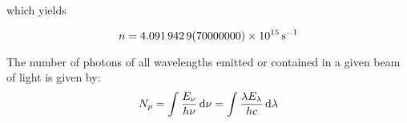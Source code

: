 which yields

\[
n=\text{\SI{4.0919429+-7e15}{\per\second}}
\]
\cite{Cheung2007}

The number of photons of all wavelengths emitted or contained in a given beam of light is given by:
\begin{equation}
	N_p=\int\frac{E_{\nu}}{h\nu}\mathop{}\!\mathrm{d}\nu =\int\frac{\lambda E_{\lambda} }{hc} \mathop{}\!\mathrm{d}\lambda
\end{equation}






